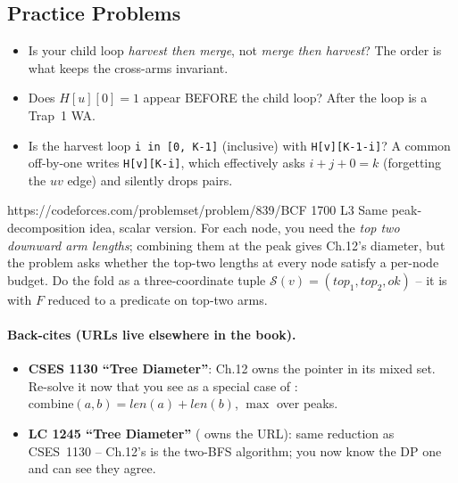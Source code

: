 \subsection{Practice Problems}

\begin{stuckbox}
\begin{itemize}[nosep, leftmargin=1.4em]
  \item Is your child loop \emph{harvest then merge}, not \emph{merge
        then harvest}? The order is what keeps the cross-arms invariant.
  \item Does $\mathit{H}[u][0]=1$ appear BEFORE the child loop? After
        the loop is a Trap~1 WA.
  \item Is the harvest loop \lstinline{i in [0, K-1]} (inclusive) with
        \lstinline{H[v][K-1-i]}? A common off-by-one writes
        \lstinline{H[v][K-i]}, which effectively asks $i+j+0=k$ (forgetting
        the $uv$ edge) and silently drops pairs.
\end{itemize}
\end{stuckbox}

\begin{practiceset}
    {https://codeforces.com/problemset/problem/839/B}{CF 1700 L3}
    {Same peak-decomposition idea, scalar version. For each node, you need
    the \emph{top two downward arm lengths}; combining them at the peak
    gives Ch.12's diameter, but the problem asks whether the top-two
    lengths at every node satisfy a per-node budget. Do the fold as a
    three-coordinate tuple $\mathcal S(v)=(\mathit{top}_1,\mathit{top}_2,
    \mathit{ok})$ -- it is  with $F$ reduced to a
    predicate on top-two arms.}
\end{practiceset}

\paragraph{Back-cites (URLs live elsewhere in the book).}
\begin{itemize}[nosep,leftmargin=1.4em]
  \item \textbf{CSES 1130 ``Tree Diameter''}: Ch.12 owns the pointer in its
        mixed set. Re-solve it now that you see  as a
        special case of : $\mathrm{combine}(a,b)=
        \mathit{len}(a)+\mathit{len}(b)$, $\max$ over peaks.
  \item \textbf{LC 1245 ``Tree Diameter''} ( owns the URL): same
        reduction as CSES~1130 -- Ch.12's  is the
        two-BFS algorithm; you now know the DP one and can see they agree.
\end{itemize}

